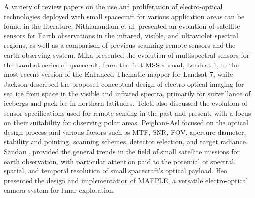 \documentclass[final,5p,times,sort&compress,twocolumn]{elsarticle}
\begin{document}
A variety of review papers on the use and proliferation of electro-optical technologies deployed with small spacecraft for various application areas can be found in the literature. Nithianandam et al. \cite{JNithianandam_1993} presented an evolution of satellite sensors for Earth observations in the infrared, visible, and ultraviolet spectral regions, as well as a comparison of previous scanning remote sensors and the earth observing system.
Mika \cite{mika1997three} presented the evolution of multispectral sensors for the Landsat series of spacecraft, from the first MSS abroad, Landsat 1, to the most recent version of the Enhanced Thematic mapper for Landsat-7, while Jackson \cite{jackson1997system} described the proposed conceptual design of electro-optical imaging for sea ice from space in the visible and infrared spectra, primarily for surveillance of icebergs and pack ice in northern latitudes. Teleti \cite{teleti2013sea} also discussed the evolution of sensor specifications used for remote sensing in the past and present, with a focus on their suitability for observing polar areas.
Peighani-Asl \cite{peighani2010electro} focused on the optical design process and various factors such as MTF, SNR, FOV, aperture diameter, stability and pointing, scanning schemes, detector selection, and target radiance. Sandau \cite{sandau2010status}, provided the general trends in the field of small satellite missions for earth observation, with particular attention paid to the potential of spectral, spatial, and temporal resolution of small spacecraft's optical payload.  Heo \cite{heo2012design} presented the design and implementation of MAEPLE, a versatile electro-optical camera system for lunar exploration. 
\end{document}

